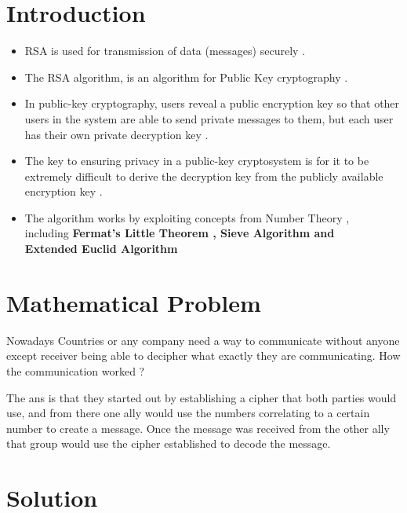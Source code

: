 \documentclass{article}
\begin{document}
\section{Introduction\\}
	
\begin{itemize}
\item RSA is used for transmission of data (messages) securely . 
\item The RSA algorithm, is an algorithm for Public Key cryptography .
\item In public-key cryptography, users reveal a public encryption key so that other users in the system are able to send private messages to them, but each user has their own private decryption key . 
\item The key to ensuring privacy in a public-key cryptosystem is for it to be extremely difficult to derive the decryption key from the publicly available encryption key . 
\item The algorithm works by exploiting concepts from Number Theory ,\\ including \textbf{Fermat’s Little Theorem , Sieve Algorithm and \\Extended Euclid Algorithm}   
\end{itemize}
\vspace{1cm}
\section{Mathematical Problem\\}

    Nowadays Countries or any company need a way to communicate without anyone except receiver being able to decipher what exactly they are communicating. How the communication worked ?
    
    The ans is that they started out by establishing a cipher that both parties would use, and from there one ally would use the numbers correlating to a certain number to create a message. Once the message was received from the other ally that group would use the cipher established to decode the message.

\pagebreak

\section{Solution\\}
\end{document}
